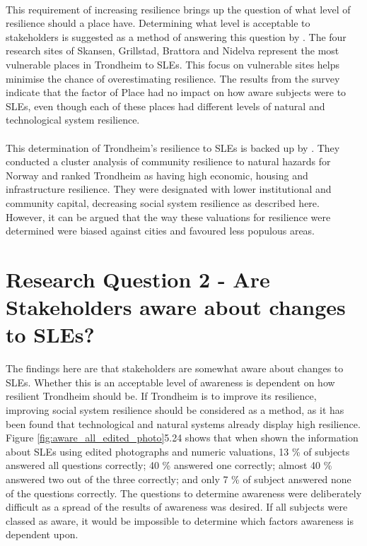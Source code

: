 \paragraph{}
This requirement of increasing resilience brings up the question of what level of resilience should a place have. Determining what level is acceptable to stakeholders is suggested as a method of answering this question by \cite{gerkensmeier_governing_2018}. The four research sites of Skansen, Grillstad, Brattora and Nidelva represent the most vulnerable places in Trondheim to SLEs. This focus on vulnerable sites helps minimise the chance of overestimating resilience. The results from the survey indicate that the factor of Place had no impact on how aware subjects were to SLEs, even though each of these places had different levels of natural and technological system resilience. 
\paragraph{}
This determination of Trondheim's resilience to SLEs is backed up by \cite{opach_seeking_2020}. They conducted a cluster analysis of community resilience to natural hazards for Norway and ranked Trondheim as having high economic, housing and infrastructure resilience. They were designated with lower institutional and community capital, decreasing social system resilience as described here. However, it can be argued that the way these valuations for resilience were determined were biased against cities and favoured less populous areas.



\section{Research Question 2 - Are Stakeholders aware about changes to SLEs?}

The findings here are that stakeholders are somewhat aware about changes to SLEs. Whether this is an acceptable level of awareness is dependent on how resilient Trondheim should be. If Trondheim is to improve its resilience, improving social system resilience should be considered as a method, as it has been found that technological and natural systems already display high resilience. Figure \ref{fig:aware_all_edited_photo}5.24 shows that when shown the information about SLEs using edited photographs and numeric valuations, 13 \% of subjects answered all questions correctly; 40 \% answered one correctly; almost 40 \% answered two out of the three correctly; and only 7 \% of subject answered none of the questions correctly. The questions to determine awareness were deliberately difficult as a spread of the results of awareness was desired. If all subjects were classed as aware, it would be impossible to determine which factors awareness is dependent upon. 
